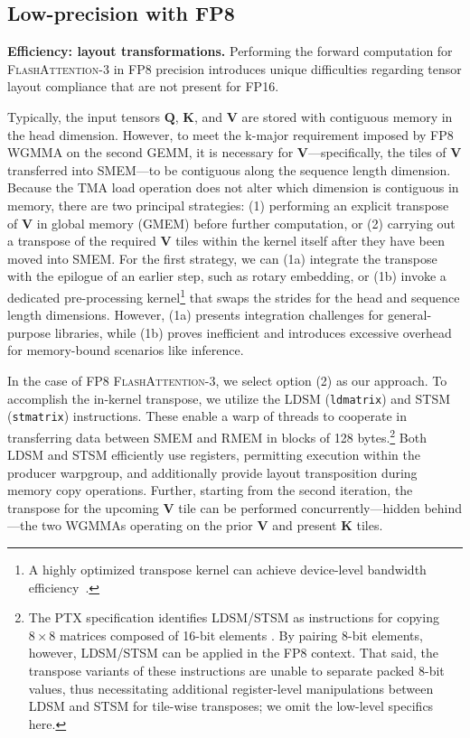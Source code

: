 \subsection{Low-precision with FP8}
\label{sec:algofp8}

\textbf{Efficiency: layout transformations.} Performing the forward computation for \textsc{FlashAttention-3} in FP8 precision introduces unique difficulties regarding tensor layout compliance that are not present for FP16.

Typically, the input tensors $\mathbf{Q}$, $\mathbf{K}$, and $\mathbf{V}$ are stored with contiguous memory in the head dimension. However, to meet the k-major requirement imposed by FP8 WGMMA on the second GEMM, it is necessary for $\mathbf{V}$—specifically, the tiles of $\mathbf{V}$ transferred into SMEM—to be contiguous along the sequence length dimension. Because the TMA load operation does not alter which dimension is contiguous in memory, there are two principal strategies: (1) performing an explicit transpose of $\mathbf{V}$ in global memory (GMEM) before further computation, or (2) carrying out a transpose of the required $\mathbf{V}$ tiles within the kernel itself after they have been moved into SMEM. For the first strategy, we can (1a) integrate the transpose with the epilogue of an earlier step, such as rotary embedding, or (1b) invoke a dedicated pre-processing kernel\footnote{A highly optimized transpose kernel can achieve device-level bandwidth efficiency~\citep{colfax_cutlass_transpose_2024}.} that swaps the strides for the head and sequence length dimensions. However, (1a) presents integration challenges for general-purpose libraries, while (1b) proves inefficient and introduces excessive overhead for memory-bound scenarios like inference.

In the case of FP8 \textsc{FlashAttention-3}, we select option (2) as our approach. To accomplish the in-kernel transpose, we utilize the LDSM (\verb|ldmatrix|) and STSM (\verb|stmatrix|) instructions. These enable a warp of threads to cooperate in transferring data between SMEM and RMEM in blocks of 128 bytes.\footnote{The PTX specification identifies LDSM/STSM as instructions for copying $8 \times 8$ matrices composed of 16-bit elements \cite[\S 9.7.13.4.15-16]{ptx}. By pairing 8-bit elements, however, LDSM/STSM can be applied in the FP8 context. That said, the transpose variants of these instructions are unable to separate packed 8-bit values, thus necessitating additional register-level manipulations between LDSM and STSM for tile-wise transposes; we omit the low-level specifics here.} Both LDSM and STSM efficiently use registers, permitting execution within the producer warpgroup, and additionally provide layout transposition during memory copy operations. Further, starting from the second iteration, the transpose for the upcoming $\mathbf{V}$ tile can be performed concurrently—hidden behind—the two WGMMAs operating on the prior $\mathbf{V}$ and present $\mathbf{K}$ tiles.

